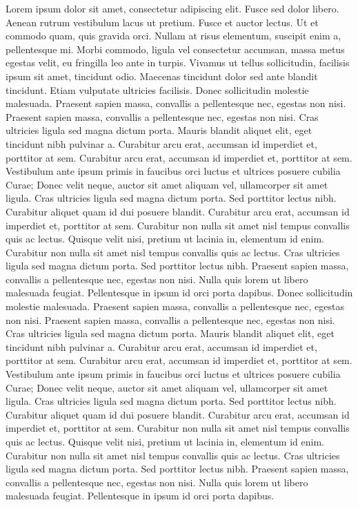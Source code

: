 \documentclass{article}
\begin{document}
\beginnumbering
\pstart
Lorem ipsum dolor sit amet, consectetur adipiscing elit. Fusce sed dolor libero. Aenean rutrum vestibulum lacus ut pretium. Fusce et auctor lectus. Ut et commodo quam, quis gravida orci. Nullam at risus elementum, suscipit enim a, pellentesque mi. Morbi commodo, ligula vel consectetur accumsan, massa metus egestas velit, eu fringilla leo ante in turpis. Vivamus ut tellus sollicitudin, facilisis ipsum sit amet, tincidunt odio. Maecenas tincidunt dolor sed ante blandit tincidunt. Etiam vulputate ultricies facilisis.
Donec sollicitudin molestie malesuada. Praesent sapien massa, convallis a pellentesque nec, egestas non nisi. Praesent sapien massa, convallis a pellentesque nec, egestas non nisi. Cras ultricies ligula sed magna dictum porta. Mauris blandit aliquet elit, eget tincidunt nibh pulvinar a. Curabitur arcu erat, accumsan id imperdiet et, porttitor at sem. Curabitur arcu erat, accumsan id imperdiet et, porttitor at sem. Vestibulum ante ipsum primis in faucibus orci luctus et ultrices posuere cubilia Curae; Donec velit neque, auctor sit amet aliquam vel, ullamcorper sit amet ligula. Cras ultricies ligula sed magna dictum porta. Sed porttitor lectus nibh. Curabitur aliquet quam id dui posuere blandit. Curabitur arcu erat, accumsan id imperdiet et, porttitor at sem. Curabitur non nulla sit amet nisl tempus convallis quis ac lectus. Quisque velit nisi, pretium ut lacinia in, elementum id enim. Curabitur non nulla sit amet nisl tempus convallis quis ac lectus. Cras ultricies ligula sed magna dictum porta. Sed porttitor lectus nibh. Praesent sapien massa, convallis a pellentesque nec, egestas non nisi. Nulla quis lorem ut libero malesuada feugiat. Pellentesque in ipsum id orci porta dapibus.
Donec sollicitudin molestie malesuada. Praesent sapien massa, convallis a pellentesque nec, egestas non nisi. Praesent sapien massa, convallis a pellentesque nec, egestas non nisi. Cras ultricies ligula sed magna dictum porta. Mauris blandit aliquet elit, eget tincidunt nibh pulvinar a. Curabitur arcu erat, accumsan id imperdiet et, porttitor at sem. Curabitur arcu erat, accumsan id imperdiet et, porttitor at sem. Vestibulum ante ipsum primis in faucibus orci luctus et ultrices posuere cubilia Curae;
 Donec velit neque, auctor sit amet aliquam vel, ullamcorper sit amet ligula. Cras ultricies ligula sed magna dictum porta. Sed porttitor lectus nibh. Curabitur aliquet quam id dui posuere blandit. Curabitur arcu erat, accumsan id imperdiet et, porttitor at sem. Curabitur non nulla sit amet nisl tempus convallis quis ac lectus. Quisque velit nisi, pretium ut lacinia in, elementum id enim. Curabitur non nulla sit amet nisl tempus convallis quis ac lectus. Cras ultricies ligula sed magna dictum porta. Sed porttitor lectus nibh. Praesent sapien massa, convallis a pellentesque nec, egestas non nisi. Nulla quis lorem ut libero malesuada feugiat. Pellentesque in ipsum id orci porta dapibus.
\end{document}
